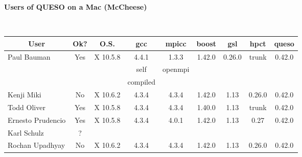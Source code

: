 \documentclass[12pt,letterpaper,twoside,onecolumn,portrait,leqno]{book}
\begin{document}
\setlength{\unitlength}{1.0in}
\setlength{\parindent}{0cm}
\setlength{\parskip}{2ex}
\thispagestyle{empty}

\centerline{\bf Users of QUESO on a Mac (McCheese)}

$~$\\

\begin{table}[!h]
\begin{center}
\begin{tabular}{|l|c|c|c|c|c|c|c|c|}
\hline
\multicolumn{1}{|c|}{User} & Ok? & O.S.     & gcc      & mpicc   & boost  & gsl    & hpct      & queso  \\
\hline
\hline
Paul Bauman                & Yes & X 10.5.8 & 4.4.1    & 1.3.3   & 1.42.0 & 0.26.0 & trunk     & 0.42.0 \\
                           &     &          & self     & openmpi &        &        &           &        \\
                           &     &          & compiled &         &        &        &           &        \\
\hline
Kenji Miki                 & No  & X 10.6.2 & 4.3.4    & 4.3.4   & 1.42.0 & 1.13   & 0.26.0    & 0.42.0 \\
\hline
Todd Oliver                & Yes & X 10.5.8 & 4.3.4    & 4.3.4   & 1.40.0 & 1.13   & trunk     & 0.42.0 \\
\hline
Ernesto Prudencio          & Yes & X 10.5.8 & 4.3.4    & 4.0.1   & 1.42.0 & 1.13   & 0.27      & 0.42.0 \\
\hline
Karl Schulz                & ?   &          &          &         &        &        &           &        \\
\hline
Rochan Upadhyay            & No  & X 10.6.2 & 4.3.4    & 4.3.4   & 1.42.0 & 1.13   & 0.26.0    & 0.42.0 \\
\hline
\end{tabular}
\end{center}
\end{table}
\end{document}
